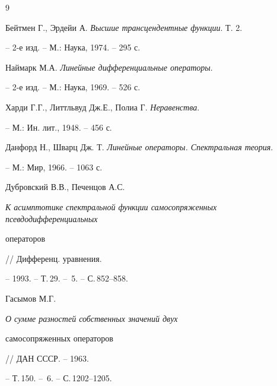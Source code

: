 \begin{thebibliography}{9}







Бейтмен Г., Эрдейи А. {\em Высшие трансцендентные функции}. Т. 2.


-- 2-е изд. -- М.: Наука, 1974. -- 295 с.




Наймарк М.А. {\em Линейные дифференциальные операторы}.


-- 2-е изд. -- М.: Наука, 1969. -- 526 с.




Харди Г.Г., Литтльвуд Дж.Е., Полиа Г. {\em Неравенства}.


-- М.: Ин. лит., 1948. -- 456 с.




Данфорд Н., Шварц Дж. Т. {\em Линейные операторы. Спектральная теория}.


-- М.: Мир, 1966. -- 1063 с.




Дубровский В.В., Печенцов А.С.


{\em К асимптотике спектральной функции самосопряженных псевдодифференциальных


операторов} // Дифференц. уравнения.


-- 1993. -- Т.\,29. -- \No\,5. -- С.\,852--858.




Гасымов М.Г. {\em О сумме разностей собственных значений двух


самосопряженных операторов} // ДАН СССР. -- 1963.


-- Т.\,150. -- \No\,6. -- С.\,1202--1205.





\end{thebibliography}





\vskip 2cm












\label{end}





